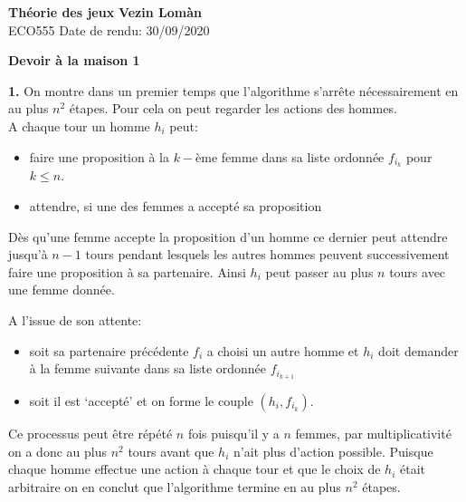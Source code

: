 \documentclass[12pt]{article}\usepackage[top=1in, bottom=1in, left=1in, right=1in]{geometry}
\begin{document}
        \noindent
\textbf{Théorie des jeux} \hfill \textbf{Vezin Lomàn}\\
\normalsize ECO555 \hfill Date de rendu: 30/09/2020\\

\begin{center}
\textbf{Devoir à la maison 1}
\end{center}

\bigskip
        
\textbf{1.} On montre dans un premier temps que l'algorithme s'arrête nécessairement en au plus $n^{2}$ étapes. Pour cela on peut regarder les actions des hommes. \\

A chaque tour un homme $h_{i}$ peut:
\begin{itemize}
        \item faire une proposition à la $k-$ème femme dans sa liste ordonnée $f_{i_{k}}$ pour $k \le n$.
        \item attendre, si une des femmes a accepté sa proposition
\end{itemize}
Dès qu'une femme accepte la proposition d'un homme ce dernier peut attendre jusqu'à $n-1$ tours pendant lesquels les autres hommes peuvent successivement faire une proposition à sa partenaire. Ainsi $h_i$ peut passer au plus $n$ tours avec une femme donnée.

A l'issue de son attente:
\begin{itemize}
        \item soit sa partenaire précédente $f_{i}$ a choisi un autre homme et $h_{i}$ doit demander à la femme suivante dans sa liste ordonnée $f_{i_{k+1}}$ 
        \item soit il est `accepté' et on forme le couple $(h_{i}, f_{i_{k}})$.
\end{itemize}  
Ce processus peut être répété $n$ fois puisqu'il y a $n$ femmes, par multiplicativité on a donc au plus $n^{2}$ tours avant que $h_{i}$ n'ait plus d'action possible. Puisque chaque homme effectue une action à chaque tour et que le choix de $h_{i}$ était arbitraire on en conclut que l'algorithme termine en au plus $n^{2}$ étapes.

\bigskip
\end{document}
